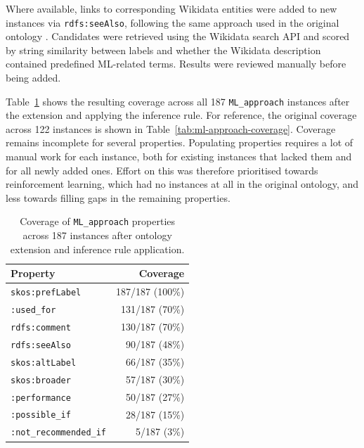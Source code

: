 Where available, links to corresponding Wikidata entities were added 
to new instances via \texttt{rdfs:seeAlso}, following the same 
approach used in the original ontology 
\parencite{humm2026industry_ready_machine_learning_ontology}. 
Candidates were retrieved using the Wikidata search API and scored 
by string similarity between labels and whether the Wikidata 
description contained predefined ML-related terms. Results were 
reviewed manually before being added.

Table~\ref{tab:ml-approach-coverage-extended} shows the resulting 
coverage across all 187 \texttt{ML\_approach} instances after the 
extension and applying the inference rule. For reference, 
the original coverage across 122 instances is shown in 
Table~\ref{tab:ml-approach-coverage}. 
Coverage remains incomplete for several properties. Populating 
properties requires a lot of manual work for each 
instance, both for existing instances that lacked them and for 
all newly added ones. Effort on this was therefore prioritised towards 
reinforcement learning, which had no instances at all in the 
original ontology, and less towards filling gaps in the 
remaining properties. 

\begin{table}[H]
\centering
\caption[ML\_approach property coverage after extension]{Coverage 
of \texttt{ML\_approach} properties across 187 instances after 
ontology extension and inference rule application.}
\label{tab:ml-approach-coverage-extended}
\begin{tabular}{lr}
\toprule
\textbf{Property} & \textbf{Coverage} \\
\midrule
\texttt{skos:prefLabel}        & 187/187 (100\%) \\
\texttt{:used\_for}            & 131/187 (70\%)  \\
\texttt{rdfs:comment}          & 130/187 (70\%)  \\
\texttt{rdfs:seeAlso}          & 90/187 (48\%)   \\
\texttt{skos:altLabel}         & 66/187 (35\%)   \\
\texttt{skos:broader}          & 57/187 (30\%)   \\
\texttt{:performance}          & 50/187 (27\%)   \\
\texttt{:possible\_if}         & 28/187 (15\%)   \\
\texttt{:not\_recommended\_if} & 5/187 (3\%)     \\
\bottomrule
\end{tabular}
\end{table}

